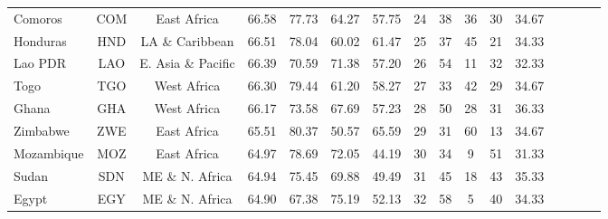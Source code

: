 \begin{longtable}[H]{lccccccccccccccc}
Comoros                           & COM           & East Africa        & 66.58       & 77.73            & 64.27                     & 57.75           & 24             & 38                  & 36                           & 30                 & 34.67                  \\
Honduras                          & HND           & LA \& Caribbean    & 66.51       & 78.04            & 60.02                     & 61.47           & 25             & 37                  & 45                           & 21                 & 34.33                  \\
Lao PDR  & LAO           & E. Asia \& Pacific & 66.39       & 70.59            & 71.38                     & 57.20           & 26             & 54                  & 11                           & 32                 & 32.33                  \\
Togo                              & TGO           & West Africa        & 66.30       & 79.44            & 61.20                     & 58.27           & 27             & 33                  & 42                           & 29                 & 34.67                  \\
Ghana                             & GHA           & West Africa        & 66.17       & 73.58            & 67.69                     & 57.23           & 28             & 50                  & 28                           & 31                 & 36.33                  \\
Zimbabwe                          & ZWE           & East Africa        & 65.51       & 80.37            & 50.57                     & 65.59           & 29             & 31                  & 60                           & 13                 & 34.67                  \\
Mozambique                        & MOZ           & East Africa        & 64.97       & 78.69            & 72.05                     & 44.19           & 30             & 34                  & 9                            & 51                 & 31.33                  \\
Sudan                             & SDN           & ME \& N. Africa    & 64.94       & 75.45            & 69.88                     & 49.49           & 31             & 45                  & 18                           & 43                 & 35.33                  \\
Egypt                             & EGY           & ME \& N. Africa    & 64.90       & 67.38            & 75.19                     & 52.13           & 32             & 58                  & 5                            & 40                 & 34.33                  \\

\end{longtable}
